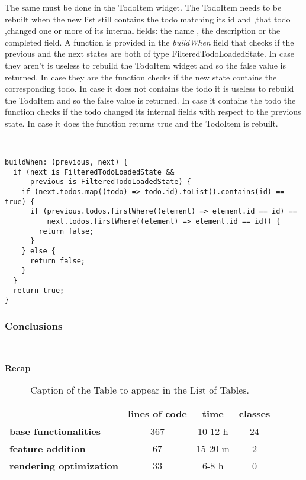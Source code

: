 The same must be done in the TodoItem widget. The TodoItem needs to be rebuilt when the new list still contains the todo matching its id and ,that todo ,changed one or more of its internal fields: the name , the description or the completed field. A function is provided in the \textit{buildWhen} field that checks if the previous and the next states are both of type FilteredTodoLoadedState. In case they aren’t is useless to rebuild the TodoItem widget and so the false value is returned. In case they are the function checks if the new state contains the corresponding todo. In case it does not contains the todo it is useless to rebuild the TodoItem and so the false value is returned. In case it contains the todo the function checks if the todo changed its internal fields with respect to the previous state. In case it does the function returns true and the  TodoItem is rebuilt.
\begin{code}
\mbox{}\\
 \mbox{}
\label{code:2.14}
\begin{verbatim}
buildWhen: (previous, next) {
  if (next is FilteredTodoLoadedState &&
      previous is FilteredTodoLoadedState) {
    if (next.todos.map((todo) => todo.id).toList().contains(id) == true) {
      if (previous.todos.firstWhere((element) => element.id == id) ==
          next.todos.firstWhere((element) => element.id == id)) {
        return false;
      }
    } else {
      return false;
    }
  }
  return true;
}
\end{verbatim}
\mbox{}
\end{code}




\subsubsection{Conclusions} \mbox{} \\
\label{subpar:render_optimizations_inherited_widget}
\begin{table}[H]
    \caption*{\textbf{Recap}}
    \centering 
    \begin{tabular}{| l | c | c | c |}
    \hline
    \rowcolor{bluepoli!40} %
    \hline
     & \textbf{lines of code} & \textbf{time} & \textbf{classes} \T\B \\
    \hline
    \textbf{base functionalities} & 367 & 10-12 h & 24 \T\B \\ 
    \textbf{feature addition} & 67 & 15-20 m & 2 \T\B\\ 
    \textbf{rendering optimization} & 33 & 6-8 h & 0
    \T\B\\
    \hline
    \end{tabular}
    \\[10pt]
    \caption{Caption of the Table to appear in the List of Tables.}
    \label{table:example}
\end{table}

